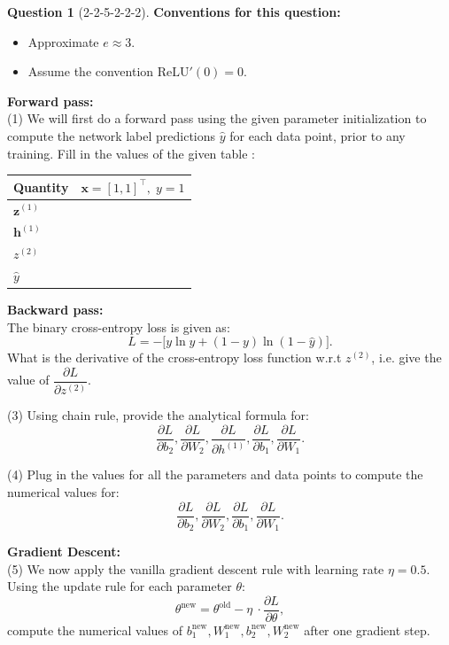 \documentclass[12pt]{article}
\theoremstyle{definition}
\newtheorem{exercise}{Question}%
\newcommand{\pd}[2]{\dfrac{\partial #1}{\partial #2}}
\newcommand{\relu}{\mathrm{ReLU}}
\newcommand{\vect}[1]{\bm{#1}}
\begin{document}
\begin{exercise}[2-2-5-2-2-2]
{\noindent \textbf{Conventions for this question:}
\begin{itemize}[nosep]
    \item Approximate $e \approx 3$.
    \item Assume the convention $\relu'(0) = 0$.
\end{itemize}

\textbf{Forward pass:} \\
\noindent (1) We will first do a forward pass using the given parameter initialization to compute the network label predictions $\hat{y}$ for each data point, prior to any training. Fill in the values of the given table :
\begin{center}
\renewcommand{\arraystretch}{1.4}
\begin{tabular}{l|c}
    \toprule
    \textbf{Quantity} & $\vect{x} = [1,1]^\top,\; y = 1$ \\
    \midrule
    $\vect{z}^{(1)}$ &   \\
    $\vect{h}^{(1)}$ &   \\
    $z^{(2)}$        &   \\
    $\hat{y}$        &   \\
    \bottomrule
\end{tabular}
\end{center}

\textbf{Backward pass:} \\
The binary cross-entropy loss is given as:
\begin{equation*}
    L = -\Big[ y \ln \hat{y} + (1 - y) \ln(1 - \hat{y}) \Big].
    \label{eq:bce}
\end{equation*}
What is the derivative of the cross-entropy loss function w.r.t $z^{(2)}$, i.e. give the value of $\pd{L}{z^{(2)}}$.

\noindent (3) Using chain rule, provide the analytical formula for:
\begin{equation*}
    \pd{L}{b_2}, \pd{L}{W_2}, \pd{L}{h^{(1)}}, \pd{L}{b_1}, \pd{L}{W_1}. 
\end{equation*}

\noindent (4) Plug in the values for all the parameters and data points to compute the numerical values for:
\begin{equation*}
    \pd{L}{b_2}, \pd{L}{W_2}, \pd{L}{b_1}, \pd{L}{W_1}. 
\end{equation*}

\textbf{Gradient Descent:}\\
\noindent (5) We now apply the vanilla gradient descent rule with learning rate $\eta = 0.5$. Using the update rule for each parameter $\theta$:
\begin{equation}
    \theta^{\text{new}} = \theta^{\text{old}} - \eta\ \cdot \pd{L}{\theta},
    \label{eq:update}
\end{equation}
compute the numerical values of $b^{\text{new}}_1, W^{\text{new}}_1, b^{\text{new}}_2, W^{\text{new}}_2$ after one gradient step.

}
\end{exercise}
\end{document}
